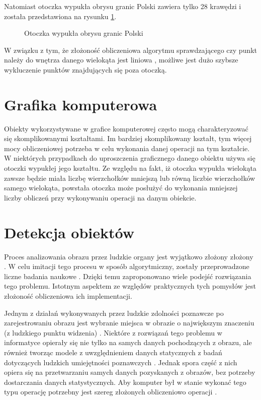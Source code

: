     	Natomiast otoczka wypukła obrysu granic Polski zawiera tylko 28 krawędzi i została przedstawiona na rysunku \ref{fig:poland_convex_hull}.
    	  \begin{figure}[h!]
        	\begin{center}
    			
    			\caption{Otoczka wypukła obrysu granic Polski}\label{fig:poland_convex_hull}
    	    \end{center}
    	    \mysource
    	\end{figure}
    	
    	W związku z tym, że złożoność obliczeniowa algorytmu sprawdzającego czy punkt należy do wnętrza danego wielokąta jest liniowa \cite{complex}, możliwe jest dużo szybsze wykluczenie punktów znajdujących się poza otoczką. 
		\section{Grafika komputerowa}
		Obiekty wykorzystywane w grafice komputerowej często mogą charakteryzować się skomplikowanymi kształtami. Im bardziej skomplikowany kształt, tym więcej mocy obliczeniowej potrzeba w celu wykonania danej operacji na tym kształcie. W niektórych przypadkach do uproszczenia graficznego danego obiektu używa się otoczki wypukłej jego kształtu. Ze względu na fakt, iż otoczka wypukła wielokąta zawsze będzie miała liczbę wierzchołków mniejszą lub równą liczbie wierzchołków samego wielokąta, powstała otoczka może posłużyć do wykonania mniejszej liczby obliczeń przy wykonywaniu operacji na danym obiekcie.
		\section{Detekcja obiektów}
		Proces analizowania obrazu przez ludzkie organy jest wyjątkowo złożony złożony \cite{BIEDERMAN198529}. W celu imitacji tego procesu w sposób algorytmiczny, zostały przeprowadzone liczne badania naukowe \cite{detection}. Dzięki temu zaproponowano wiele podejść rozwiązania tego problemu. Istotnym aspektem ze względów praktycznych tych pomysłów jest złożoność obliczeniowa ich implementacji.
		
		Jednym z działań wykonywanych przez ludzkie zdolności poznawcze po zarejestrowaniu obrazu jest wybranie miejsca w obrazie o największym znaczeniu (z ludzkiego punktu widzenia) \cite{s23146450}. Niektóre z rozwiązań tego problemu w informatyce opierały się nie tylko na samych danych pochodzących z obrazu, ale również tworząc modele z uwzględnieniem danych statycznych z badań dotyczących ludzkich umiejętności poznawczych \cite{Borji_Cheng_Hou_Jiang_Li_2019}. Jednak spora część z nich opiera się na przetwarzaniu samych danych pozyskanych z obrazów, bez potrzeby dostarczania danych statystycznych. Aby komputer był w stanie wykonać tego typu operację potrzebny jest szereg złożonych obliczeniowo operacji \cite{detection, Borji_Cheng_Hou_Jiang_Li_2019}. 
		
